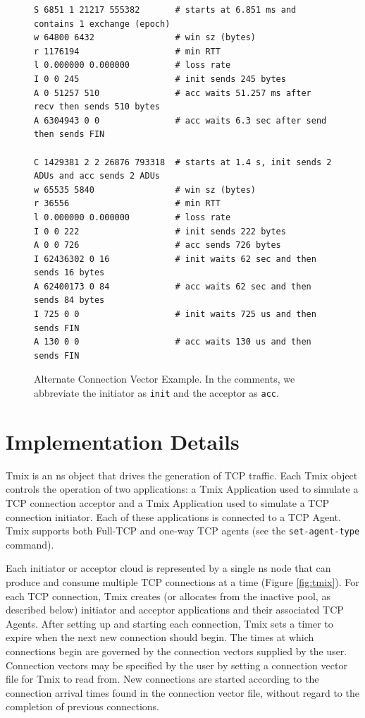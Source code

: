 \begin{figure}
\makebox[\columnwidth]{\hrulefill}
\small
\begin{verbatim}
S 6851 1 21217 555382       # starts at 6.851 ms and contains 1 exchange (epoch)
w 64800 6432                # win sz (bytes)
r 1176194                   # min RTT
l 0.000000 0.000000         # loss rate
I 0 0 245                   # init sends 245 bytes
A 0 51257 510               # acc waits 51.257 ms after recv then sends 510 bytes
A 6304943 0 0               # acc waits 6.3 sec after send then sends FIN

C 1429381 2 2 26876 793318  # starts at 1.4 s, init sends 2 ADUs and acc sends 2 ADUs
w 65535 5840                # win sz (bytes)
r 36556                     # min RTT
l 0.000000 0.000000         # loss rate
I 0 0 222                   # init sends 222 bytes
A 0 0 726                   # acc sends 726 bytes
I 62436302 0 16             # init waits 62 sec and then sends 16 bytes
A 62400173 0 84             # acc waits 62 sec and then sends 84 bytes
I 725 0 0                   # init waits 725 us and then sends FIN
A 130 0 0                   # acc waits 130 us and then sends FIN
\end{verbatim}
\makebox[\columnwidth]{\hrulefill}
\caption{\label{alt-cvec}Alternate Connection Vector Example.
In the comments, we abbreviate the initiator as \texttt{init} and the
acceptor as \texttt{acc}.}
\end{figure}

\section{Implementation Details}

Tmix is an ns object that drives the generation of TCP traffic. Each
Tmix object controls the operation of two applications: a Tmix
Application used to simulate a TCP connection acceptor and a Tmix
Application used to simulate a TCP connection initiator. Each of these
applications is connected to a TCP Agent. Tmix supports both Full-TCP
and one-way TCP agents (see the {\tt set-agent-type} command).

Each initiator or acceptor cloud is represented by a single ns node
that can produce and consume multiple TCP connections at a time
(Figure \ref{fig:tmix}). For each TCP connection, Tmix creates (or
allocates from the inactive pool, as described below) initiator and
acceptor applications and their associated TCP Agents. After setting up
and starting each connection, Tmix sets a timer to expire when
the next new connection should begin. The times at which connections begin
are governed by the connection vectors supplied by the user.  Connection
vectors may be specified by the user by setting a connection vector file for 
Tmix to read from.  New connections are started according to the connection 
arrival times found in the connection vector file, without regard to the 
completion of previous connections.

